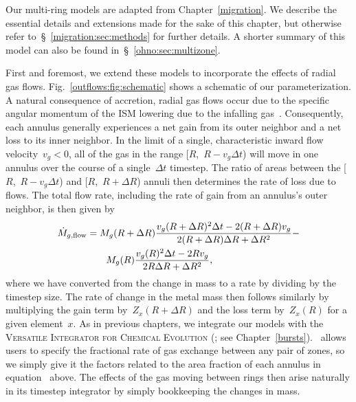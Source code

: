 Our multi-ring models are adapted from Chapter~\ref{migration}.
We describe the essential details and extensions made for the sake of this
chapter, but otherwise refer to~\S~\ref{migration:sec:methods} for further
details.
A shorter summary of this model can also be found
in~\S~\ref{ohno:sec:multizone}.
\par
First and foremost, we extend these models to incorporate the effects of radial
gas flows.
Fig.~\ref{outflows:fig:schematic} shows a schematic of our parameterization.
A natural consequence of accretion, radial gas flows occur due to the specific
angular momentum of the ISM lowering due to the infalling gas~\citep{Lacey1985,
Bilitewski2012}.
Consequently, each annulus generally experiences a net gain from its outer
neighbor and a net loss to its inner neighbor.
In the limit of a single, characteristic inward flow velocity~$v_g < 0$, all of
the gas in the range [$R$,~$R - v_g \Delta t$) will move in one annulus over
the course of a single~$\Delta t$ timestep.
The ratio of areas between the [$R$,~$R - v_g \Delta t$) and
[$R$,~$R + \Delta R$) annuli then determines the rate of loss due to flows.
The total flow rate, including the rate of gain from an annulus's outer
neighbor, is then given by
\begin{equation}\begin{split}
\dot{M}_{g,\text{flow}} &= M_g(R + \Delta R) \frac{
	v_g(R + \Delta R)^2 \Delta t - 2 (R + \Delta R) v_g
}{
	2 (R + \Delta R) \Delta R + \Delta R^2
} -
\\
&\qquad M_g(R) \frac{
	v_g(R)^2 \Delta t - 2 R v_g
}{
	2 R \Delta R + \Delta R^2
},
\label{outflows:eq:mdot-gas-flow-areafrac}
\end{split}\end{equation}
where we have converted from the change in mass to a rate by dividing by the
timestep size.
The rate of change in the metal mass then follows similarly by multiplying the
gain term by~$Z_x(R + \Delta R)$ and the loss term by~$Z_x(R)$ for a given
element~$x$.
As in previous chapters, we integrate our models with the
\textsc{Versatile Integrator for Chemical Evolution} (\vice; see
Chapter~\ref{bursts}).
\vice~allows users to specify the fractional rate of gas exchange between any
pair of zones, so we simply give it the factors related to the area fraction of
each annulus in equation~ above.
The effects of the gas moving between rings then arise naturally in its
timestep integrator by simply bookkeeping the changes in mass.
\par
